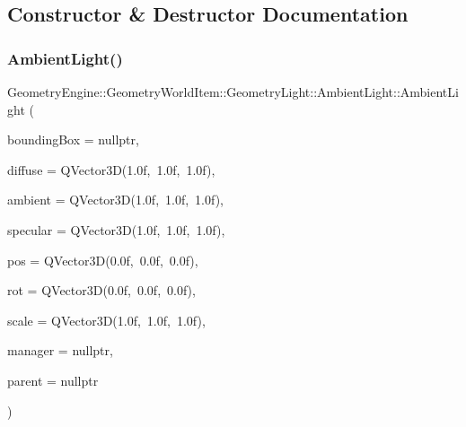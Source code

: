 \subsection{Constructor \& Destructor Documentation}
\mbox{\label{class_geometry_engine_1_1_geometry_world_item_1_1_geometry_light_1_1_ambient_light_a650db3630a679fb479200fc881efe25e}} 
\subsubsection{\texorpdfstring{AmbientLight()}{AmbientLight()}\hspace{0.1cm}{\footnotesize\ttfamily [1/2]}}
{\footnotesize\ttfamily Geometry\+Engine\+::\+Geometry\+World\+Item\+::\+Geometry\+Light\+::\+Ambient\+Light\+::\+Ambient\+Light (\begin{DoxyParamCaption}\item[{\mbox{\hyperlink{class_geometry_engine_1_1_geometry_world_item_1_1_geometry_item_1_1_geometry_item}{Geometry\+Item\+::\+Geometry\+Item}} $\ast$}]{bounding\+Box = {\ttfamily nullptr},  }\item[{const Q\+Vector3D \&}]{diffuse = {\ttfamily QVector3D(1.0f,~1.0f,~1.0f)},  }\item[{const Q\+Vector3D \&}]{ambient = {\ttfamily QVector3D(1.0f,~1.0f,~1.0f)},  }\item[{const Q\+Vector3D \&}]{specular = {\ttfamily QVector3D(1.0f,~1.0f,~1.0f)},  }\item[{const Q\+Vector3D \&}]{pos = {\ttfamily QVector3D(0.0f,~0.0f,~0.0f)},  }\item[{const Q\+Vector3D \&}]{rot = {\ttfamily QVector3D(0.0f,~0.0f,~0.0f)},  }\item[{const Q\+Vector3D \&}]{scale = {\ttfamily QVector3D(1.0f,~1.0f,~1.0f)},  }\item[{const \mbox{\hyperlink{class_geometry_engine_1_1_light_utils_1_1_light_component_manager}{Light\+Utils\+::\+Light\+Component\+Manager}} $\ast$const}]{manager = {\ttfamily nullptr},  }\item[{\mbox{\hyperlink{class_geometry_engine_1_1_geometry_world_item_1_1_world_item}{World\+Item}} $\ast$}]{parent = {\ttfamily nullptr} }\end{DoxyParamCaption})}

